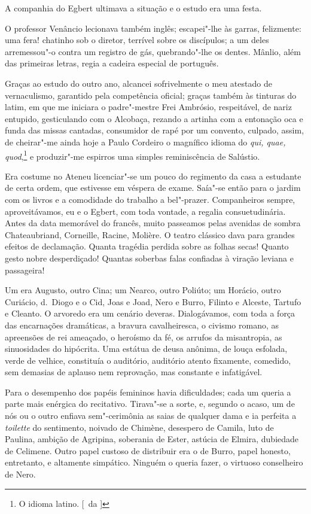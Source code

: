 A companhia do Egbert ultimava a situação e o estudo era uma festa. 

O professor Venâncio
lecionava também inglês; escapei"-lhe às garras, felizmente: uma fera!
chatinho sob o diretor, terrível sobre os discípulos; a um deles
arremessou"-o contra um registro de gás, quebrando"-lhe os dentes.
Mânlio, além das primeiras letras, regia a cadeira especial de
português. 

Graças ao estudo do outro ano, alcancei sofrivelmente o meu
atestado de vernaculismo, garantido pela competência oficial; graças
também às tinturas do latim, em que me iniciara o padre"-mestre Frei
Ambrósio, respeitável, de nariz entupido, gesticulando com o Alcobaça,
rezando a artinha com a entonação oca e funda das missas cantadas,
consumidor de rapé por um convento, culpado, assim, de cheirar"-me
ainda hoje a Paulo Cordeiro o magnífico idioma do \textit{qui, quae, quod},\footnote{ O idioma 
latino. [~da ]} e produzir"-me espirros uma simples reminiscência de Salústio. 

Era costume no Ateneu licenciar"-se um pouco do regimento da casa a
estudante de certa ordem, que estivesse em véspera de exame. Saía"-se
então para o jardim com os livros e a comodidade do trabalho a
bel"-prazer. Companheiros sempre, aproveitávamos, eu e o Egbert, com
toda vontade, a regalia consuetudinária. Antes da data memorável do
francês, muito passeamos pelas avenidas de sombra Chateaubriand,
Corneille, Racine, Molière. O teatro clássico dava para grandes efeitos
de declamação. Quanta tragédia perdida sobre as folhas secas! Quanto
gesto nobre desperdiçado! Quantas soberbas falas confiadas à viração
leviana e passageira! 

Um era Augusto, outro Cina; um Nearco, outro
Poliúto; um Horácio, outro Curiácio, d.~Diogo e o Cid, Joas e Joad,
Nero e Burro, Filinto e Alceste, Tartufo e Cleanto. O arvoredo era um
cenário deveras. Dialogávamos, com toda a força das encarnações
dramáticas, a bravura cavalheiresca, o civismo romano, as apreensões de
rei ameaçado, o heroísmo da fé, os arrufos da misantropia, as
sinuosidades do hipócrita. Uma estátua de deusa anônima, de louça
esfolada, verde de velhice, constituía o auditório, auditório atento
fixamente, comedido, sem demasias de aplauso nem reprovação, mas
constante e infatigável. 

Para o desempenho dos papéis femininos havia
dificuldades; cada um queria a parte mais enérgica do recitativo.
Tirava"-se a sorte, e, segundo o acaso, um de nós ou o outro enfiava
sem"-cerimônia as saias de qualquer dama e ia perfeita a \textit{toilette} do
sentimento, noivado de Chimène, desespero de Camila, luto de Paulina,
ambição de Agripina, soberania de Ester, astúcia de Elmira, dubiedade
de Celimene. Outro papel custoso de distribuir era o de Burro, papel
honesto, entretanto, e altamente simpático. Ninguém o queria fazer, o
virtuoso conselheiro de Nero. 

